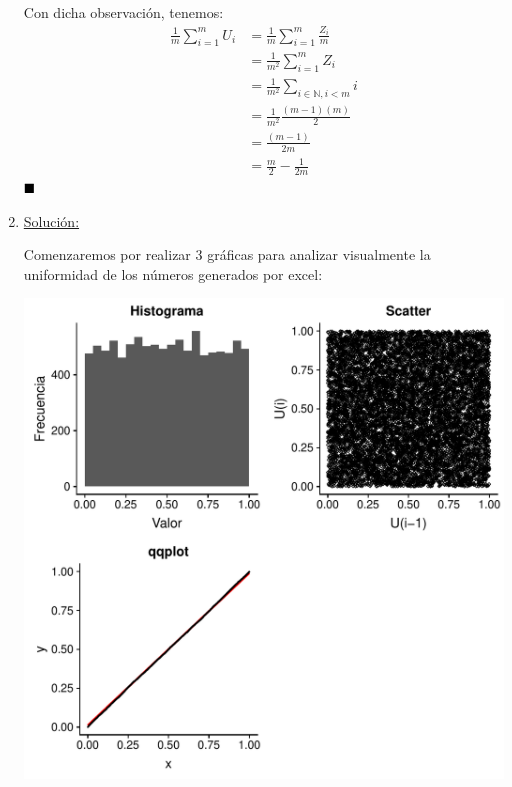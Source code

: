 \documentclass[12 pt]{article}\usepackage[]{graphicx}\usepackage[]{color}
\makeatletter
\def\maxwidth{ %
  \ifdim\Gin@nat@width>\linewidth
    \linewidth
  \else
    \Gin@nat@width
  \fi
}
\newenvironment{knitrout}{}{} %
\renewcommand\qedsymbol{$\null\hfill\blacksquare$}
\makeatother
\begin{document}
\begin{enumerate}
    Con dicha observación, tenemos: 
    \begin{align*}
        \frac{1}{m}\sum_{i=1}^{m} U_i &= \frac{1}{m}\sum_{i=1}^{m} \frac{Z_i}{m} \\
        &= \frac{1}{m^2}\sum_{i=1}^{m}  Z_i  \\
        &= \frac{1}{m^2}\sum_{i\in\mathbb{N}, i<m} i \\
        &= \frac{1}{m^2} \frac{(m-1)(m)}{2} \\
        &= \frac{(m-1)}{2m} \\
        &= \frac{m}{2} - \frac{1}{2m}
    \end{align*}
    \qedsymbol
    
    \newpage
    
    \item 
    \underline{Solución:}

    Comenzaremos por realizar 3 gráficas para analizar visualmente la uniformidad de los números generados por excel:





\begin{knitrout}
\color{fgcolor}
\includegraphics[width=\maxwidth]{figure/unnamed-chunk-4-1} 

\end{knitrout}


\end{enumerate}
\end{document}
